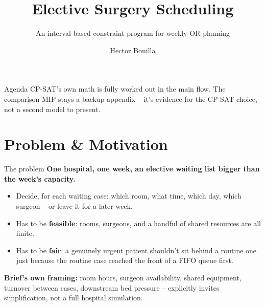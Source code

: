 \documentclass[aspectratio=169]{beamer}
\title{Elective Surgery Scheduling}
\subtitle{An interval-based constraint program for weekly OR planning}
\author{Hector Bonilla}
\date{}
\begin{document}
\begin{frame}
  \titlepage
\end{frame}

\begin{frame}{Agenda}
  \hypertarget{toc}{}
  \tableofcontents
  \vfill
  \footnotesize CP-SAT's own math is fully worked out in the main flow. The
  comparison MIP stays a backup appendix -- it's evidence for the CP-SAT
  choice, not a second model to present.
\end{frame}

\section{Problem \& Motivation}

\begin{frame}{The problem}
  \textbf{One hospital, one week, an elective waiting list bigger than the
  week's capacity.}
  \begin{itemize}
    \item Decide, for each waiting case: which room, what time, which day,
      which surgeon -- or leave it for a later week.
    \item Has to be \textbf{feasible}: rooms, surgeons, and a handful of
      shared resources are all finite.
    \item Has to be \textbf{fair}: a genuinely urgent patient shouldn't sit
      behind a routine one just because the routine case reached the front
      of a FIFO queue first.
  \end{itemize}
  \vspace{1em}
  \pause
  \textbf{Brief's own framing:} room hours, surgeon availability, shared
  equipment, turnover between cases, downstream bed pressure -- explicitly
  invites simplification, not a full hospital simulation.
\end{frame}
\end{document}
